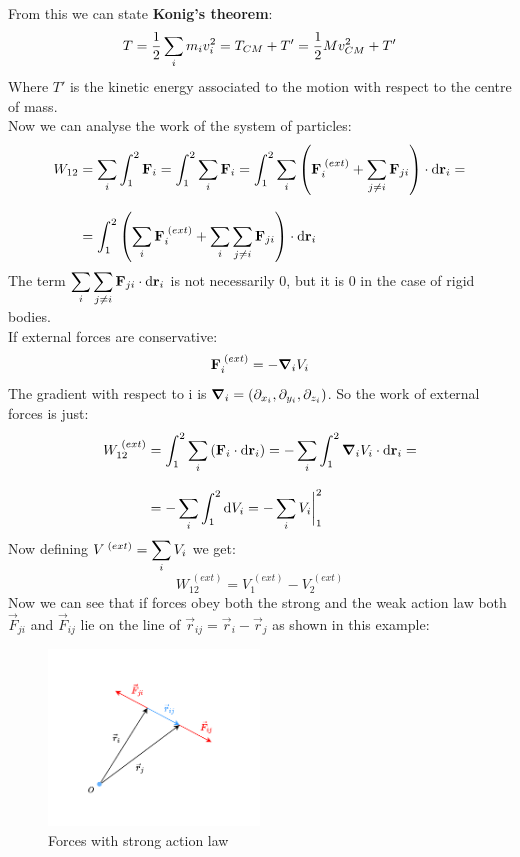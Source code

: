 From this we can state \textbf{Konig's theorem}:
\begin{equation}
    T = \dfrac{1}{2}\displaystyle\sum_i m_i v_i^2 = T_{CM} + T' = \dfrac{1}{2}M v_{CM}^2 + T'
\end{equation}
Where $T'$ is the kinetic energy associated to the motion with respect to the centre of mass.\\
Now we can analyse the work of the system of particles:
\begin{equation}
    \begin{split}
      W_{12} &= \displaystyle\sum_i\int_{1}^{2}\vb{F}_i = \int_{1}^{2}\displaystyle\sum_i\vb{F}_i = \int_{1}^{2}\displaystyle\sum_i\left(\vb{F}_i^{\;(ext)} + \displaystyle\sum_{j\neq i}\vb{F}_{ji}\right)\cdot \dd{\vb{r}_i} = \\[8pt]
    &= \int_{1}^{2}\left(\displaystyle\sum_i\vb{F}_i^{\;(ext)} + \displaystyle\sum_i\displaystyle\sum_{j\neq i}\vb{F}_{ji}\right)\cdot \dd{\vb{r}_i}
    \end{split}
\end{equation}
The term $\displaystyle\sum_i\displaystyle\sum_{j\neq i}\vb{F}_{ji}\cdot \dd{\vb{r}_i}$ is not necessarily 0, but it is 0 in the case of rigid bodies.\\
If external forces are conservative:
\begin{equation}
    \vb{F}_i^{\;(ext)} = -\grad_i V_i
\end{equation}
The gradient with respect to i is $\grad_i = \left(\partial_{x_i}, \partial_{y_i}, \partial_{z_i}\right)$. So the work of external forces is just:
\begin{equation}
    \begin{split}
      W_{12}^{\;(ext)} &= \int_{1}^{2}\displaystyle\sum_i\left(\vb{F}_i\cdot\dd{\vb{r}_i}\right) = -\displaystyle\sum_i\int_{1}^{2}\grad_i V_i\cdot\dd{\vb{r}_i} =\\[8pt]
    &= -\displaystyle\sum_i\int_{1}^{2}\dd{V_i} = -\displaystyle\sum_i V_i\bigg|_1^2
    \end{split}
\end{equation}
Now defining $V^{\;(ext)} = \displaystyle\sum_i V_i$ we get:
\begin{equation}
    W_{12}^{\;(ext)} = V^{\;(ext)}_1 - V^{\;(ext)}_2
\end{equation}
Now we can see that if forces obey both the strong and the weak action law both $\vec{F}_{ji}$ and $\vec{F}_{ij}$ lie on the line of $\vec{r}_{ij} = \vec{r}_i-\vec{r}_j$ as shown in this example:
\begin{figure}[H]
    \centering
    \includegraphics[width=0.5\textwidth]{res/svg/forcesstronglaw.drawio}
    \caption{Forces with strong action law}
    \label{fig:image5}
\end{figure}
